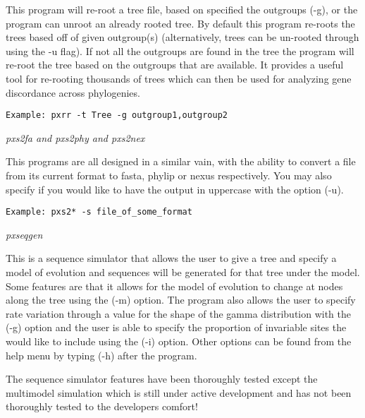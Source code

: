 \documentclass[12pt,letterpaper]{article}
\renewcommand{\subsection}[1]{%
\bigskip
\begin{center}
\begin{large}
\normalfont\itshape #1
\end{large}
\end{center}}
\begin{document}
This program will re-root a tree file, based on specified the outgroups (-g), or the program can unroot an already rooted tree. By default this program re-roots the trees based off of given outgroup(s) (alternatively, trees can be un-rooted through using the -u flag). If not all the outgroups are found in the tree the program will re-root the tree based on the outgroups that are available. It provides a useful tool for re-rooting thousands of trees which can then be used for analyzing gene discordance across phylogenies.

\begin{flushleft}
\begin{verbatim}
Example: pxrr -t Tree -g outgroup1,outgroup2
\end{verbatim}
\end{flushleft}

\subsection{pxs2fa and pxs2phy and  pxs2nex}

This programs are all designed in a similar vain, with the ability to convert a file from its current format to fasta, phylip or nexus respectively. You may also specify if you would like to have the output in uppercase with the option (-u).


\begin{flushleft}
\begin{verbatim}
Example: pxs2* -s file_of_some_format
\end{verbatim}
\end{flushleft}

\subsection{pxseqgen}

This is a sequence simulator that allows the user to give a tree and specify a model of evolution and sequences will be generated for that tree under the model. Some features are that it allows for the model of evolution to change at nodes along the tree using the (-m) option. The program also allows the user to specify rate variation through a value for the shape of the gamma distribution with the (-g) option and the user is able to specify the proportion of invariable sites the would like to include using the (-i) option. Other options can be found from the help menu by typing (-h) after the program.

The sequence simulator features have been thoroughly tested except the multimodel simulation which is still under active development and has not been thoroughly tested to the developers comfort!
\end{document}
